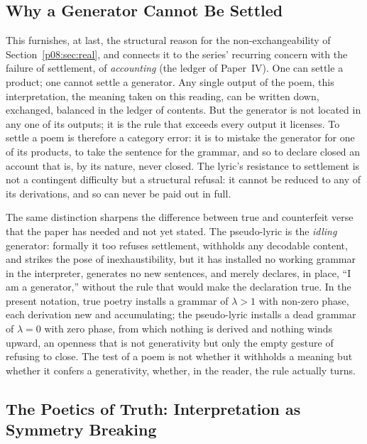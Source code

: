 \subsection{Why a Generator Cannot Be Settled}\label{p08:sec:grammar-settle}

This furnishes, at last, the structural reason for the non-exchangeability of Section~\ref{p08:sec:real}, and connects it to the series' recurring concern with the failure of settlement, of \emph{accounting} (the ledger of Paper~IV). One can settle a product; one cannot settle a generator. Any single output of the poem, this interpretation, the meaning taken on this reading, can be written down, exchanged, balanced in the ledger of contents. But the generator is not located in any one of its outputs; it is the rule that exceeds every output it licenses. To settle a poem is therefore a category error: it is to mistake the generator for one of its products, to take the sentence for the grammar, and so to declare closed an account that is, by its nature, never closed. The lyric's resistance to settlement is not a contingent difficulty but a structural refusal: it cannot be reduced to any of its derivations, and so can never be paid out in full.

The same distinction sharpens the difference between true and counterfeit verse that the paper has needed and not yet stated. The pseudo-lyric is the \emph{idling} generator: formally it too refuses settlement, withholds any decodable content, and strikes the pose of inexhaustibility, but it has installed no working grammar in the interpreter, generates no new sentences, and merely declares, in place, ``I am a generator,'' without the rule that would make the declaration true. In the present notation, true poetry installs a grammar of $\lambda > 1$ with non-zero phase, each derivation new and accumulating; the pseudo-lyric installs a dead grammar of $\lambda = 0$ with zero phase, from which nothing is derived and nothing winds upward, an openness that is not generativity but only the empty gesture of refusing to close. The test of a poem is not whether it withholds a meaning but whether it confers a generativity, whether, in the reader, the rule actually turns.

\subsection{The Poetics of Truth: Interpretation as Symmetry Breaking}\label{p08:sec:grammar-truth}

